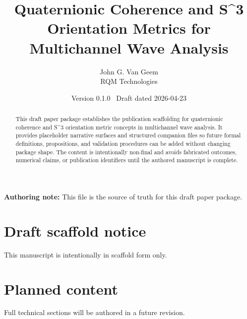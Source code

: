 \documentclass[11pt]{article}
\title{\textbf{Quaternionic Coherence and S^3 Orientation Metrics for Multichannel Wave Analysis}}
\author{John G. Van Geem\\RQM Technologies}
\date{Version 0.1.0 \ Draft dated 2026-04-23}
\begin{document}
\maketitle

\begin{abstract}
This draft paper package establishes the publication scaffolding for quaternionic coherence and S^3 orientation metric concepts in multichannel wave analysis. It provides placeholder narrative surfaces and structured companion files so future formal definitions, propositions, and validation procedures can be added without changing package shape. The content is intentionally non-final and avoids fabricated outcomes, numerical claims, or publication identifiers until the authored manuscript is complete.
\end{abstract}

\noindent\textbf{Authoring note:} This file is the source of truth for this draft paper package.

\section{Draft scaffold notice}
This manuscript is intentionally in scaffold form only.

\section{Planned content}
Full technical sections will be authored in a future revision.



\end{document}
